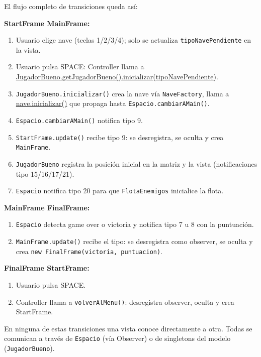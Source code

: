 \documentclass[12pt, a4paper]{article}
\begin{document}
\begin{cajafinal}
El flujo completo de transiciones queda as\'{i}:
 
\textbf{StartFrame \textrightarrow{} MainFrame:}
\begin{enumerate}
    \item Usuario elige nave (teclas 1/2/3/4); solo se actualiza \texttt{tipoNavePendiente} en la vista.
    \item Usuario pulsa SPACE: Controller llama a \url{JugadorBueno.getJugadorBueno().inicializar(tipoNavePendiente)}.
    \item \texttt{JugadorBueno.inicializar()} crea la nave v\'{i}a \texttt{NaveFactory}, llama a \url{nave.inicializar()} que propaga hasta \texttt{Espacio.cambiarAMain()}.
    \item \texttt{Espacio.cambiarAMain()} notifica tipo 9.
    \item \texttt{StartFrame.update()} recibe tipo 9: se desregistra, se oculta y crea \texttt{MainFrame}.
    \item \texttt{JugadorBueno} registra la posici\'{o}n inicial en la matriz y la vista (notificaciones tipo 15/16/17/21).
    \item \texttt{Espacio} notifica tipo 20 para que \texttt{FlotaEnemigos} inicialice la flota.
\end{enumerate}
 
\textbf{MainFrame \textrightarrow{} FinalFrame:}
\begin{enumerate}
    \item \texttt{Espacio} detecta game over o victoria y notifica tipo 7 u 8 con la puntuaci\'{o}n.
    \item \texttt{MainFrame.update()} recibe el tipo: se desregistra como observer, se oculta y crea \texttt{new FinalFrame(victoria, puntuacion)}.
\end{enumerate}
 
\textbf{FinalFrame \textrightarrow{} StartFrame:}
\begin{enumerate}
    \item Usuario pulsa SPACE.
    \item Controller llama a \texttt{volverAlMenu()}: desregistra observer, oculta y crea StartFrame.
\end{enumerate}
 
En ninguna de estas transiciones una vista conoce directamente a otra. Todas se comunican a trav\'{e}s de \texttt{Espacio} (v\'{i}a Observer) o de singletons del modelo (\texttt{JugadorBueno}).
\end{cajafinal}
 
\end{document}
